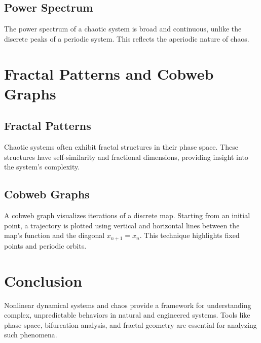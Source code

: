 \documentclass{article}
\begin{document}
\subsection{Power Spectrum}
The power spectrum of a chaotic system is broad and continuous, unlike the discrete peaks of a periodic system. This reflects the aperiodic nature of chaos.

\section{Fractal Patterns and Cobweb Graphs}

\subsection{Fractal Patterns}
Chaotic systems often exhibit fractal structures in their phase space. These structures have self-similarity and fractional dimensions, providing insight into the system's complexity.

\subsection{Cobweb Graphs}
A cobweb graph visualizes iterations of a discrete map. Starting from an initial point, a trajectory is plotted using vertical and horizontal lines between the map's function and the diagonal $x_{n+1} = x_n$. This technique highlights fixed points and periodic orbits.

\section{Conclusion}
Nonlinear dynamical systems and chaos provide a framework for understanding complex, unpredictable behaviors in natural and engineered systems. Tools like phase space, bifurcation analysis, and fractal geometry are essential for analyzing such phenomena.
\end{document}
